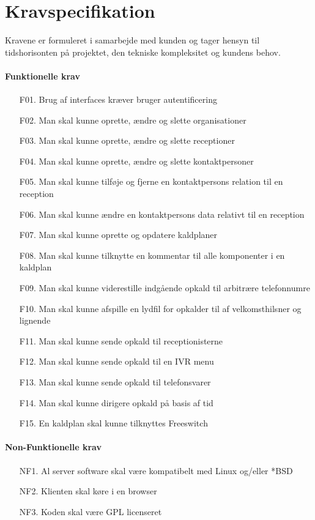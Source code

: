 \section{Kravspecifikation}
Kravene er formuleret i samarbejde med kunden og tager hensyn til tidshorisonten på projektet, den tekniske kompleksitet og kundens behov.

\paragraph{Funktionelle krav}
\begin{enumerate}
  \item[F01.] Brug af interfaces kræver bruger autentificering
  \item[F02.] Man skal kunne oprette, ændre og slette organisationer
  \item[F03.] Man skal kunne oprette, ændre og slette receptioner
  \item[F04.] Man skal kunne oprette, ændre og slette kontaktpersoner
  \item[F05.] Man skal kunne tilføje og fjerne en kontaktpersons relation til en reception
  \item[F06.] Man skal kunne ændre en kontaktpersons data relativt til en reception
  \item[F07.] Man skal kunne oprette og opdatere kaldplaner
  \item[F08.] Man skal kunne tilknytte en kommentar til alle komponenter i en kaldplan
  \item[F09.] Man skal kunne viderestille indgående opkald til arbitrære telefonnumre
  \item[F10.] Man skal kunne afspille en lydfil for opkalder til af velkomsthilsner og lignende
  \item[F11.] Man skal kunne sende opkald til receptionisterne
  \item[F12.] Man skal kunne sende opkald til en IVR menu
  \item[F13.] Man skal kunne sende opkald til telefonsvarer
  \item[F14.] Man skal kunne dirigere opkald på basis af tid
  \item[F15.] En kaldplan skal kunne tilknyttes Freeswitch
\end{enumerate}

\paragraph{Non-Funktionelle krav}
\begin{enumerate}
  \item[NF1.] Al server software skal være kompatibelt med Linux og/eller *BSD
  \item[NF2.] Klienten skal køre i en browser
  \item[NF3.] Koden skal være GPL licenseret
\end{enumerate}
